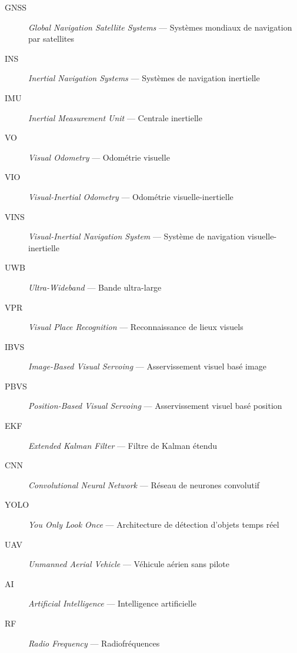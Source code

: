 \documentclass[12pt, a4paper, twoside, openright]{report}
\begin{document}
\begin{description}
    \item[GNSS] \textit{Global Navigation Satellite Systems} --- Systèmes mondiaux de navigation par satellites
    \item[INS] \textit{Inertial Navigation Systems} --- Systèmes de navigation inertielle
    \item[IMU] \textit{Inertial Measurement Unit} --- Centrale inertielle
    \item[VO] \textit{Visual Odometry} --- Odométrie visuelle
    \item[VIO] \textit{Visual-Inertial Odometry} --- Odométrie visuelle-inertielle
    \item[VINS] \textit{Visual-Inertial Navigation System} --- Système de navigation visuelle-inertielle
    \item[UWB] \textit{Ultra-Wideband} --- Bande ultra-large
    \item[VPR] \textit{Visual Place Recognition} --- Reconnaissance de lieux visuels
    \item[IBVS] \textit{Image-Based Visual Servoing} --- Asservissement visuel basé image
    \item[PBVS] \textit{Position-Based Visual Servoing} --- Asservissement visuel basé position
    \item[EKF] \textit{Extended Kalman Filter} --- Filtre de Kalman étendu
    \item[CNN] \textit{Convolutional Neural Network} --- Réseau de neurones convolutif
    \item[YOLO] \textit{You Only Look Once} --- Architecture de détection d'objets temps réel
    \item[UAV] \textit{Unmanned Aerial Vehicle} --- Véhicule aérien sans pilote
    \item[AI] \textit{Artificial Intelligence} --- Intelligence artificielle
    \item[RF] \textit{Radio Frequency} --- Radiofréquences
\end{description}
\end{document}
